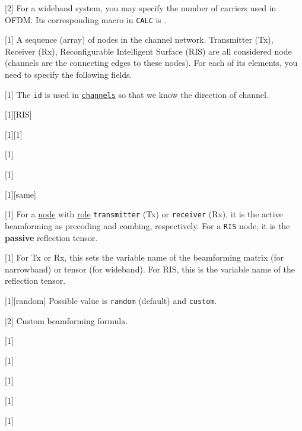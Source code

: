 [2]
For a wideband system,
you may specify the number of carriers used in OFDM.
Its corresponding
macro %
in
\texttt{CALC} %
is .

[1]
A sequence (array) of nodes in the channel network.
Transmitter (Tx), Receiver (Rx), Reconfigurable Intelligent Surface (RIS)
are all considered node (channels are the connecting edges to these nodes).
For each of its elements, you need to specify the following fields.

[1]
The \texttt{id} is used in \hyperref[d:subsec:sim_config_channels]{\texttt{channels}} so that we know the direction of channel.

[1][RIS]

[1][1]

[1]

[1]

[1][same]

[1]
For a \hyperref[d:subsec:sim_config_nodes]{node} with \hyperref[d:subsubsec:sim_config_nodes_role]{role}
\texttt{transmitter} (Tx) or \texttt{receiver} (Rx), it is the active beamforming as precoding and combing, respectively.
For a \texttt{RIS} node, it is the \textbf{passive} reflection tensor.

[1]
For Tx or Rx, this sets the variable name of the beamforming matrix (for narrowband) or tensor (for wideband).
For RIS, this is the variable name of the reflection tensor.

[1][random]
Possible value is \texttt{random} (default) and \texttt{custom}.

[2]
Custom beamforming formula.


[1]

[1]

[1]

[1]

[1]

